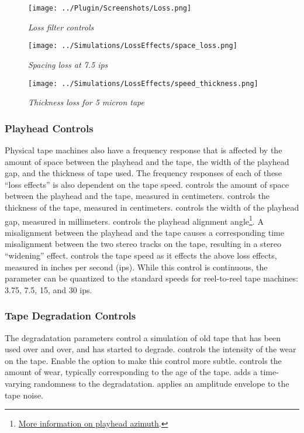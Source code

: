\documentclass[landscape,twocolumn,a5paper]{manual}
\begin{document}
\begin{figure}[ht]
    \center
    \texttt{[image: ../Plugin/Screenshots/Loss.png]}
    \caption{\label{loss_controls}{\it Loss filter controls}}
\end{figure}
%
\begin{figure}[ht]
    \center
    \texttt{[image: ../Simulations/LossEffects/space\_loss.png]}
    \caption{\label{spacing_loss}{\it Spacing loss at 7.5 ips}}
\end{figure}
%
\begin{figure}[ht]
    \center
    \texttt{[image: ../Simulations/LossEffects/speed\_thickness.png]}
    \caption{\label{thick_loss}{\it Thickness loss for 5 micron tape}}
\end{figure}

\subsubsection{Playhead Controls}
Physical tape machines also have a frequency response that
is affected by the amount of space between the playhead and
the tape, the width of the playhead gap, and the thickness
of tape used. The frequency responses of each of these ``loss
effects'' is also dependent on the tape speed.
\newpar
{}
controls the amount of space between the playhead and the tape,
measured in centimeters.
\newpar
{} controls the thickness
of the tape, measured in centimeters.
\newpar
{} controls
the width of the playhead gap, measured in millimeters.
\newpar
{}
controls the playhead alignment angle\footnote{\href{https://blog.weareavp.com/azimuth-adjustment-for-magnetic-audio-recordings}{More information on playhead azimuth}.}.
A misalignment between the playhead and the tape causes a
corresponding time misalignment between the two stereo tracks
on the tape, resulting in a stereo ``widening'' effect.
\newpar
{}
controls the tape speed as it effects the above loss effects,
measured in inches per second (ips). While this control is
continuous, the parameter can be quantized to the standard speeds
for reel-to-reel tape machines: 3.75, 7.5, 15, and 30 ips.


\subsubsection{Tape Degradation Controls}
The degradatation parameters control a simulation of
old tape that has been used over and over, and has started
to degrade.
\newline
{}
controls the intensity of the wear on the tape. Enable the
 option to make this control more subtle.
\newpar
{}
controls the amount of wear, typically corresponding to
the age of the tape.
\newpar
{}
adds a time-varying randomness to the degradatation.
\newpar
{}
applies an amplitude envelope to the tape noise.
\end{document}

